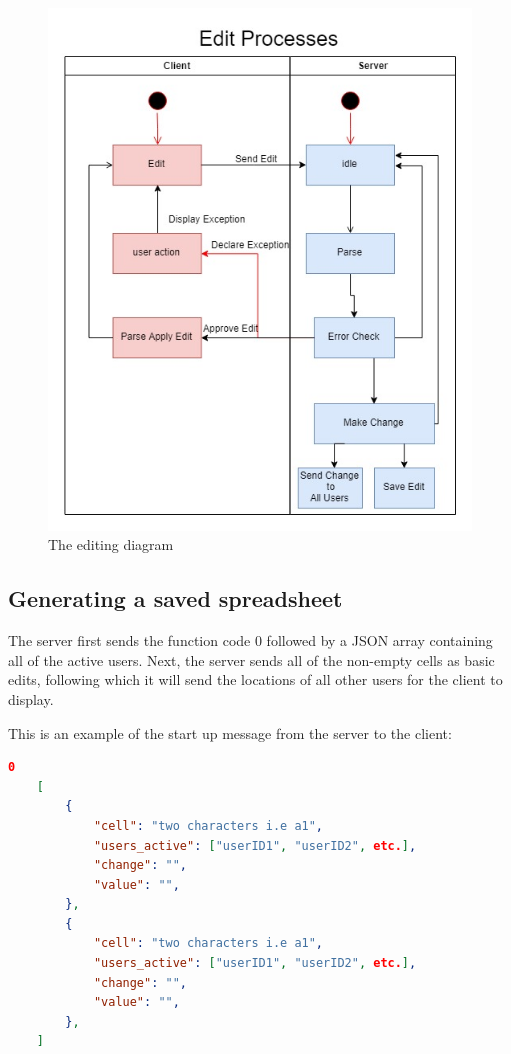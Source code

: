 \documentclass[titlepage]{article}
\begin{document}
    \begin{figure}[h!]
        \centering
        \includegraphics[width=.9\linewidth]{3-1}
        \caption{The editing diagram}
        \label{fig:editUML}
    \end{figure}
\subsection{Generating a saved spreadsheet}
    The server first sends the function code 0 followed by a JSON array containing all of the active users. Next, the server sends all of the non-empty cells as basic edits, following which it will send the locations of all other users for the client to display.  

    This is an example of the start up message from the server to the client:

    \begin{lstlisting}[language=json,firstnumber=1]
    0
    [
        {
            "cell": "two characters i.e a1",
            "users_active": ["userID1", "userID2", etc.],   
            "change": "",
            "value": "",     
        },
        {
            "cell": "two characters i.e a1",
            "users_active": ["userID1", "userID2", etc.],   
            "change": "",
            "value": "",     
        },
    ]
    \end{lstlisting}
\end{document}
